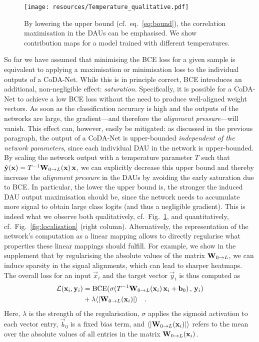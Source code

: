 \begin{figure}[t]
    \centering
    \texttt{[image: resources/Temperature\_qualitative.pdf]}
    \caption{\small By lowering the upper bound (cf.~eq.~\eqref{eq:bound}), the correlation maximisation in the DAUs can be emphasised.
    We show contribution maps for a model trained with different temperatures.
    }
    \label{fig:scaling}
\end{figure}
So far we have assumed that minimising the {BCE} loss for a given sample is equivalent to applying a maximisation or minimisation loss to the individual outputs of a CoDA-Net. While this is in principle correct, {BCE} introduces an additional, non-negligible effect: \emph{saturation}. Specifically, it is possible for a CoDA-Net to achieve a low {BCE} loss without the need to produce well-aligned weight vectors. As soon as the classification accuracy is high and the outputs of the networks are large, the gradient---and therefore the \emph{alignment pressure}---will vanish. This effect can, however, easily be mitigated:
 as discussed in the previous paragraph, the output of a CoDA-Net is upper-bounded \textit{independent of the network parameters}, since each individual DAU in the network is upper-bounded. 
By scaling the network output with a temperature parameter $T$ such that 
    $\hat{\vec y} (\vec x) = T^{-1} \mat W_{0\rightarrow L}(\vec x)\,\vec x$, 
we can explicitly decrease this upper bound and thereby increase the \emph{alignment pressure} in the DAUs by avoiding the early saturation due to {BCE}.
In particular, the lower the upper bound is, the stronger the induced DAU output maximisation should be, since the network needs to accumulate more signal to obtain large class logits (and thus a negligible gradient). This is indeed what we observe both qualitatively, cf.~Fig.~\ref{fig:scaling}, and quantitatively, cf.~Fig.~\ref{fig:localisation} (right column).
Alternatively, the representation of the network's computation as a linear mapping allows to directly regularise what properties these linear mappings should fulfill. For example, we show in the supplement that by regularising the absolute values of the matrix $\mat W_{0\rightarrow L}$, we can induce sparsity in the signal alignments, which can lead to sharper heatmaps.
%
The overall loss for an input $\vec x_i$ and the target vector $\vec y_i$ is thus computed as 
    \begin{align}
        \label{eq:loss}
        \mathcal{L}(\vec x_i, \vec y_i) &= 
        \text{BCE}(\sigma(T^{-1} \mat W_{0\rightarrow L}(\vec x_i)\,\vec{x}_i + {\vec{b}}_0)\,,\, \vec{y}_i) \\&+ 
        \lambda \langle | \mat W_{0\rightarrow L}(\vec x_i) |\rangle\quad \text{.}
    \end{align}
    Here, $\lambda$ is the strength of the regularisation, $\sigma$ applies the sigmoid activation to each vector entry,
    ${\vec{b}}_0$ is a fixed bias term, and $\langle|\mat W_{0\rightarrow L}(\vec x_i)|\rangle$ refers to the mean over the absolute values of 
        all entries in the matrix $\mat W_{0\rightarrow L}(\vec x_i)$.
%
%
%
